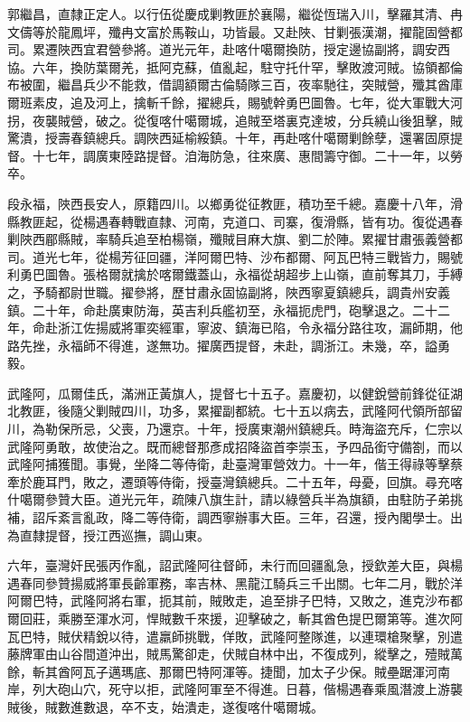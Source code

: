 \begin{pinyinscope}
郭繼昌，直隸正定人。以行伍從慶成剿教匪於襄陽，繼從恆瑞入川，擊羅其清、冉文儔等於龍鳳坪，殲冉文富於馬鞍山，功皆最。又赴陜、甘剿張漢潮，擢龍固營都司。累遷陜西宜君營參將。道光元年，赴喀什噶爾換防，授定邊協副將，調安西協。六年，換防葉爾羌，抵阿克蘇，值亂起，駐守托什罕，擊敗渡河賊。協領都倫布被圍，繼昌兵少不能救，借調額爾古倫騎隊三百，夜率馳往，突賊營，殲其酋庫爾班素皮，追及河上，擒斬千餘，擢總兵，賜號幹勇巴圖魯。七年，從大軍戰大河拐，夜襲賊營，破之。從復喀什噶爾城，追賊至塔裏克達坡，分兵繞山後狙擊，賊驚潰，授壽春鎮總兵。調陜西延榆綏鎮。十年，再赴喀什噶爾剿餘孽，還署固原提督。十七年，調廣東陸路提督。洎海防急，往來廣、惠間籌守御。二十一年，以勞卒。

段永福，陜西長安人，原籍四川。以鄉勇從征教匪，積功至千總。嘉慶十八年，滑縣教匪起，從楊遇春轉戰直隸、河南，克道口、司寨，復滑縣，皆有功。復從遇春剿陜西郿縣賊，率騎兵追至柏楊嶺，殲賊目麻大旗、劉二於陣。累擢甘肅張義營都司。道光七年，從楊芳征回疆，洋阿爾巴特、沙布都爾、阿瓦巴特三戰皆力，賜號利勇巴圖魯。張格爾就擒於喀爾鐵蓋山，永福從胡超步上山嶺，直前奪其刀，手縛之，予騎都尉世職。擢參將，歷甘肅永固協副將，陜西寧夏鎮總兵，調貴州安義鎮。二十年，命赴廣東防海，英吉利兵艦初至，永福扼虎門，砲擊退之。二十二年，命赴浙江佐揚威將軍奕經軍，寧波、鎮海已陷，令永福分路往攻，漏師期，他路先挫，永福師不得進，遂無功。擢廣西提督，未赴，調浙江。未幾，卒，謚勇毅。

武隆阿，瓜爾佳氏，滿洲正黃旗人，提督七十五子。嘉慶初，以健銳營前鋒從征湖北教匪，後隨父剿賊四川，功多，累擢副都統。七十五以病去，武隆阿代領所部留川，為勒保所忌，父喪，乃還京。十年，授廣東潮州鎮總兵。時海盜充斥，仁宗以武隆阿勇敢，故使治之。既而總督那彥成招降盜首李崇玉，予四品銜守備劄，而以武隆阿捕獲聞。事覺，坐降二等侍衛，赴臺灣軍營效力。十一年，偕王得祿等擊蔡牽於鹿耳門，敗之，遷頭等侍衛，授臺灣鎮總兵。二十五年，母憂，回旗。尋充喀什噶爾參贊大臣。道光元年，疏陳八旗生計，請以綠營兵半為旗額，由駐防子弟挑補，詔斥紊言亂政，降二等侍衛，調西寧辦事大臣。三年，召還，授內閣學士。出為直隸提督，授江西巡撫，調山東。

六年，臺灣奸民張丙作亂，詔武隆阿往督師，未行而回疆亂急，授欽差大臣，與楊遇春同參贊揚威將軍長齡軍務，率吉林、黑龍江騎兵三千出關。七年二月，戰於洋阿爾巴特，武隆阿將右軍，扼其前，賊敗走，追至排子巴特，又敗之，進克沙布都爾回莊，乘勝至渾水河，悍賊數千來援，迎擊破之，斬其酋色提巴爾第等。進次阿瓦巴特，賊伏精銳以待，遣羸師挑戰，佯敗，武隆阿整隊進，以連環槍聚擊，別遣藤牌軍由山谷間道沖出，賊馬驚卻走，伏賊自林中出，不復成列，縱擊之，殪賊萬餘，斬其酋阿瓦子邁瑪底、那爾巴特阿渾等。捷聞，加太子少保。賊壘踞渾河南岸，列大砲山穴，死守以拒，武隆阿軍至不得進。日暮，偕楊遇春乘風潛渡上游襲賊後，賊數進數退，卒不支，始潰走，遂復喀什噶爾城。


\end{pinyinscope}
